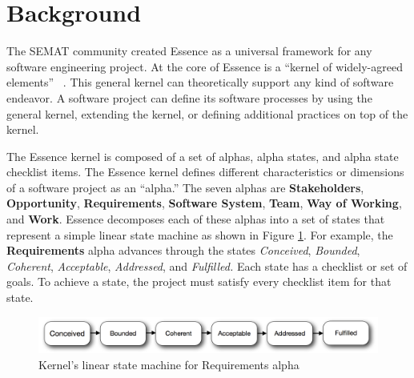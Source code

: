 \documentclass[conference]{IEEEtran}
\begin{document}
\section{Background}
The SEMAT community created Essence as a universal framework for any software engineering project. At the core of Essence is a ``kernel of widely-agreed elements'' ~\cite{JacobsonQueue}. This general kernel can theoretically support any kind of software endeavor. A software project can define its software processes by using the general kernel, extending the kernel, or defining additional practices on top of the kernel.

The Essence kernel is composed of a set of alphas, alpha states, and alpha state checklist items. The Essence kernel defines different characteristics or dimensions of a software project as an ``alpha.'' The seven alphas are \textbf{Stakeholders}, \textbf{Opportunity}, \textbf{Requirements}, \textbf{Software System}, \textbf{Team}, \textbf{Way of Working}, and \textbf{Work}. Essence decomposes each of these alphas into a set of states that represent a simple linear state machine as shown in Figure \ref{StateMachine}. For example, the \textbf{Requirements} alpha advances through the states \textit{Conceived}, \textit{Bounded}, \textit{Coherent}, \textit{Acceptable}, \textit{Addressed}, and \textit{Fulfilled.} Each state has a checklist or set of goals. To achieve a state, the project must satisfy every checklist item for that state. \cite{OMGStandard} 
 
\begin{figure}[ht]
\includegraphics[scale=0.34]{kernel_images/StateMachineRequirements}
\caption{Kernel's linear state machine for Requirements alpha}\label{StateMachine}
\end{figure}


\end{document}
